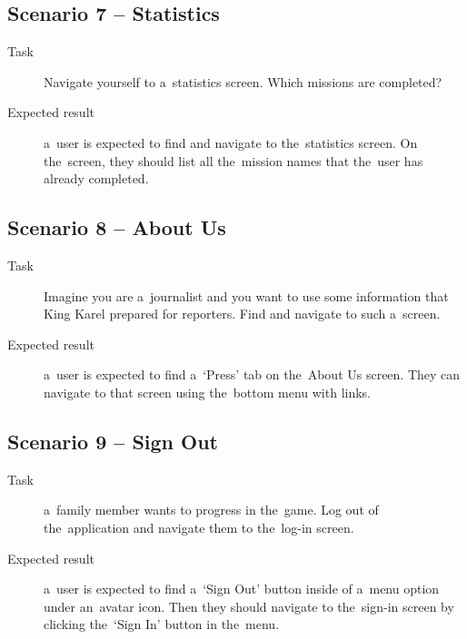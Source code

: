 \subsection*{Scenario 7 -- Statistics}

\begin{description}
    \item[Task] Navigate yourself to a~statistics screen.
    Which missions are completed?
    \item[Expected result] a~user is expected to
    find and navigate to the~statistics screen.
    On the~screen,
    they should list all the~mission names that the~user has already completed.
\end{description}

\subsection*{Scenario 8 -- About Us}

\begin{description}
    \item[Task] Imagine you are a~journalist
    and you want to use some information
    that King Karel prepared for reporters.
    Find and navigate to such a~screen.
    \item[Expected result] a~user is expected to
    find a~\enquote*{Press} tab on the~About Us screen.
    They can navigate to that screen using the~bottom menu with links.
\end{description}

\subsection*{Scenario 9 -- Sign Out}

\begin{description}
    \item[Task] a~family member wants to progress in the~game.
    Log out of the~application
    and navigate them to the~log-in screen.
    \item[Expected result] a~user is expected to
    find a~\enquote*{Sign Out} button inside of a~menu option under an~avatar icon.
    Then they should navigate to the~sign-in screen
    by clicking the~\enquote*{Sign In} button in the~menu.    
\end{description}

